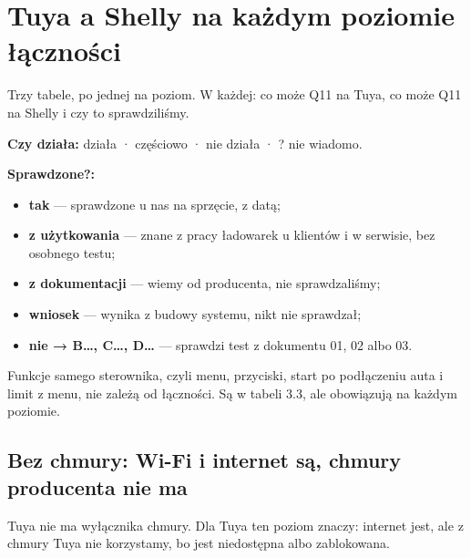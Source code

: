 \documentclass[11pt,a4paper]{article}
\begin{document}
\section{Tuya a Shelly na każdym poziomie łączności}

Trzy tabele, po jednej na poziom. W każdej: co może Q11 na Tuya, co może Q11 na Shelly i czy to sprawdziliśmy.


\textbf{Czy działa:}  działa ·  częściowo ·  nie działa · ? nie wiadomo.


\textbf{Sprawdzone?:}

\begin{itemize}
\item \textbf{tak} — sprawdzone u nas na sprzęcie, z datą;
\item \textbf{z użytkowania} — znane z pracy ładowarek u klientów i w serwisie, bez osobnego testu;
\item \textbf{z dokumentacji} — wiemy od producenta, nie sprawdzaliśmy;
\item \textbf{wniosek} — wynika z budowy systemu, nikt nie sprawdzał;
\item \textbf{nie {\symbolfont→} B…, C…, D…} — sprawdzi test z dokumentu 01, 02 albo 03.
\end{itemize}

Funkcje samego sterownika, czyli menu, przyciski, start po podłączeniu auta i limit z menu, nie zależą od łączności. Są w tabeli 3.3, ale obowiązują na każdym poziomie.


\subsection{Bez chmury: Wi-Fi i internet są, chmury producenta nie ma}

Tuya nie ma wyłącznika chmury. Dla Tuya ten poziom znaczy: internet jest, ale z chmury Tuya nie korzystamy, bo jest niedostępna albo zablokowana.
\end{document}
